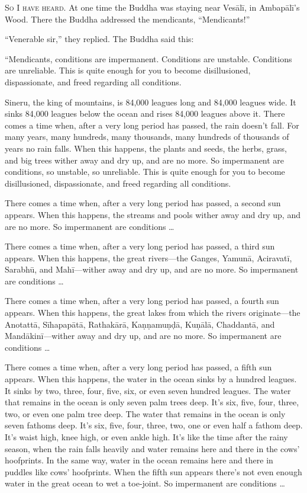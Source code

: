 \documentclass[12pt,openany]{book}%
\newcommand*{\scevam}[1]{\textsc{#1}}
\begin{document}
\scevam{So I have heard. }At one time the Buddha was staying near \textsanskrit{Vesālī}, in \textsanskrit{Ambapālī}’s Wood. There the Buddha addressed the mendicants, “Mendicants!” 

“Venerable sir,” they replied. The Buddha said this: 

“Mendicants, conditions are impermanent. Conditions are unstable. Conditions are unreliable. This is quite enough for you to become disillusioned, dispassionate, and freed regarding all conditions. 

Sineru, the king of mountains, is 84,000 leagues long and 84,000 leagues wide. It sinks 84,000 leagues below the ocean and rises 84,000 leagues above it. There comes a time when, after a very long period has passed, the rain doesn’t fall. For many years, many hundreds, many thousands, many hundreds of thousands of years no rain falls. When this happens, the plants and seeds, the herbs, grass, and big trees wither away and dry up, and are no more. So impermanent are conditions, so unstable, so unreliable. This is quite enough for you to become disillusioned, dispassionate, and freed regarding all conditions. 

There comes a time when, after a very long period has passed, a second sun appears. When this happens, the streams and pools wither away and dry up, and are no more. So impermanent are conditions … 

There comes a time when, after a very long period has passed, a third sun appears. When this happens, the great rivers—the Ganges, \textsanskrit{Yamunā}, \textsanskrit{Aciravatī}, \textsanskrit{Sarabhū}, and \textsanskrit{Mahī}—wither away and dry up, and are no more. So impermanent are conditions … 

There comes a time when, after a very long period has passed, a fourth sun appears. When this happens, the great lakes from which the rivers originate—the \textsanskrit{Anotattā}, \textsanskrit{Sīhapapātā}, \textsanskrit{Rathakārā}, \textsanskrit{Kaṇṇamuṇḍā}, \textsanskrit{Kuṇālā}, \textsanskrit{Chaddantā}, and \textsanskrit{Mandākinī}—wither away and dry up, and are no more. So impermanent are conditions … 

There comes a time when, after a very long period has passed, a fifth sun appears. When this happens, the water in the ocean sinks by a hundred leagues. It sinks by two, three, four, five, six, or even seven hundred leagues. The water that remains in the ocean is only seven palm trees deep. It’s six, five, four, three, two, or even one palm tree deep. The water that remains in the ocean is only seven fathoms deep. It’s six, five, four, three, two, one or even half a fathom deep. It’s waist high, knee high, or even ankle high. It’s like the time after the rainy season, when the rain falls heavily and water remains here and there in the cows’ hoofprints. In the same way, water in the ocean remains here and there in puddles like cows’ hoofprints. When the fifth sun appears there’s not even enough water in the great ocean to wet a toe-joint. So impermanent are conditions … 
\end{document}
